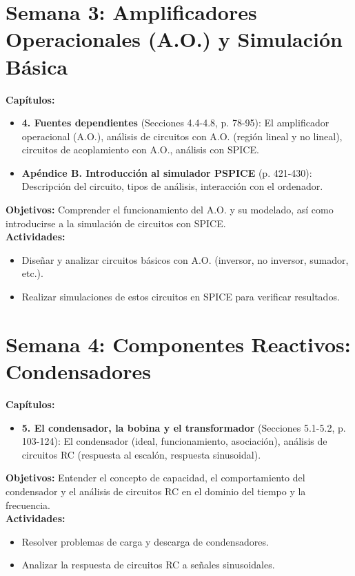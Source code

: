 \documentclass[12pt, a4paper]{article}
\begin{document}
\section{Semana 3: Amplificadores Operacionales (A.O.) y Simulación Básica}
\textbf{Capítulos:}
\begin{itemize}
    \item \textbf{4. Fuentes dependientes} (Secciones 4.4-4.8, p. 78-95): El amplificador operacional (A.O.), análisis de circuitos con A.O. (región lineal y no lineal), circuitos de acoplamiento con A.O., análisis con SPICE.
    \item \textbf{Apéndice B. Introducción al simulador PSPICE} (p. 421-430): Descripción del circuito, tipos de análisis, interacción con el ordenador.
\end{itemize}
\textbf{Objetivos:} Comprender el funcionamiento del A.O. y su modelado, así como introducirse a la simulación de circuitos con SPICE.\\
\textbf{Actividades:}
\begin{itemize}
    \item Diseñar y analizar circuitos básicos con A.O. (inversor, no inversor, sumador, etc.).
    \item Realizar simulaciones de estos circuitos en SPICE para verificar resultados.
\end{itemize}

\section{Semana 4: Componentes Reactivos: Condensadores}
\textbf{Capítulos:}
\begin{itemize}
    \item \textbf{5. El condensador, la bobina y el transformador} (Secciones 5.1-5.2, p. 103-124): El condensador (ideal, funcionamiento, asociación), análisis de circuitos RC (respuesta al escalón, respuesta sinusoidal).
\end{itemize}
\textbf{Objetivos:} Entender el concepto de capacidad, el comportamiento del condensador y el análisis de circuitos RC en el dominio del tiempo y la frecuencia.\\
\textbf{Actividades:}
\begin{itemize}
    \item Resolver problemas de carga y descarga de condensadores.
    \item Analizar la respuesta de circuitos RC a señales sinusoidales.
\end{itemize}
\end{document}
